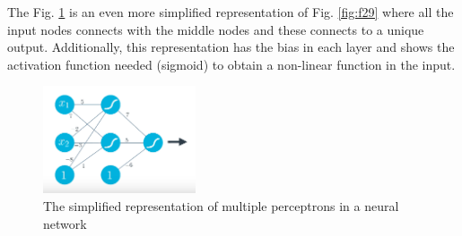 \documentclass{article}
\begin{document}
The Fig. \ref{fig:f30} is an even more simplified representation of Fig. \ref{fig:f29} where all the input nodes connects with the middle nodes and these connects to a unique output. Additionally, this representation has the bias in each layer and shows the activation function needed (sigmoid) to obtain a non-linear function in the input.

\begin{figure}[ht]
    \centering
    \includegraphics[width=0.4\textwidth,height=0.4\textheight,keepaspectratio]{images/adding_perceptrons_3.png}
    \captionsetup{justification=centering}
    \caption{The simplified representation of multiple perceptrons in a neural network}
    \label{fig:f30}
\end{figure}

\printbibliography
\end{document}
